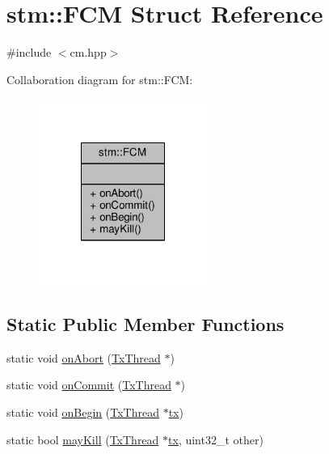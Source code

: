 \hypertarget{structstm_1_1FCM}{\section{stm\-:\-:F\-C\-M Struct Reference}
\label{structstm_1_1FCM}
}


{\ttfamily \#include $<$cm.\-hpp$>$}



Collaboration diagram for stm\-:\-:F\-C\-M\-:
\nopagebreak
\begin{figure}[H]
\begin{center}
\leavevmode
\includegraphics[width=156pt]{structstm_1_1FCM__coll__graph}
\end{center}
\end{figure}
\subsection*{Static Public Member Functions}
\begin{DoxyCompactItemize}
\item 
static void \hyperlink{structstm_1_1FCM_af32cf145a1faa41d43eb69f17c13e497}{on\-Abort} (\hyperlink{structstm_1_1TxThread}{Tx\-Thread} $\ast$)
\item 
static void \hyperlink{structstm_1_1FCM_aee25641e48adf018263566caa114d14f}{on\-Commit} (\hyperlink{structstm_1_1TxThread}{Tx\-Thread} $\ast$)
\item 
static void \hyperlink{structstm_1_1FCM_afb16a04094d3a6367daf5f6fd92fe37c}{on\-Begin} (\hyperlink{structstm_1_1TxThread}{Tx\-Thread} $\ast$\hyperlink{stmskip_8cc_a0f1c58699b83ce5a08bd9ee859250d72}{tx})
\item 
static bool \hyperlink{structstm_1_1FCM_a9e7347a65e15addef5a2bef84798c204}{may\-Kill} (\hyperlink{structstm_1_1TxThread}{Tx\-Thread} $\ast$\hyperlink{stmskip_8cc_a0f1c58699b83ce5a08bd9ee859250d72}{tx}, uint32\-\_\-t other)
\end{DoxyCompactItemize}



